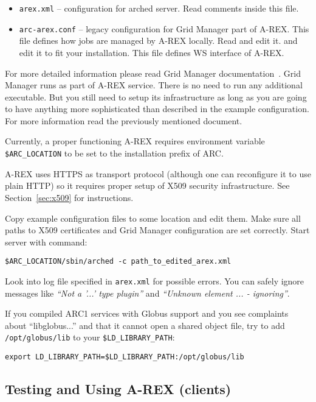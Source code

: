 \documentclass{article}                            %
\begin{document}
\begin{itemize}
 \item \texttt{arex.xml} -- configuration for arched server. Read comments
inside this file.
 \item \texttt{arc-arex.conf} -- legacy configuration for Grid Manager part of
A-REX. This
file defines how jobs are managed by A-REX locally. Read and edit it.
and edit it to fit your installation. This file defines WS interface of A-REX.
\end{itemize}

For more detailed information please read Grid Manager
documentation~\cite{arex}. Grid Manager runs as part of A-REX service. There is
no need to run any additional executable. But you still need to setup its
infrastructure as long as you are going to have anything more sophisticated than
described in the example configuration. For more information read the previously
mentioned document.

Currently, a proper functioning A-REX requires environment variable
\verb|$ARC_LOCATION| to be set to the installation prefix of ARC.

A-REX uses HTTPS as transport protocol (although one can reconfigure it to use
plain HTTP) so it requires proper setup of X509 security infrastructure. See
Section~\ref{sec:x509} for instructions.

Copy example configuration files to some location and edit them. Make sure all
paths to X509 certificates and Grid Manager configuration are set correctly.
Start server with command:

\begin{lstlisting}
$ARC_LOCATION/sbin/arched -c path_to_edited_arex.xml
\end{lstlisting}

Look into log file specified in \texttt{arex.xml} for possible errors. You can
safely ignore messages like \textit{``Not a '...' type plugin''} and
\textit{``Unknown element ... - ignoring''}.

If you compiled ARC1 services with Globus support and you see complaints about
``libglobus...'' and that it cannot open a shared object file, try to add
\texttt{/opt/globus/lib} to your \verb|$LD_LIBRARY_PATH|:

\begin{lstlisting}
export LD_LIBRARY_PATH=$LD_LIBRARY_PATH:/opt/globus/lib
\end{lstlisting}

\subsection{Testing and Using A-REX (clients)}
\label{sec:testing}
\end{document}
